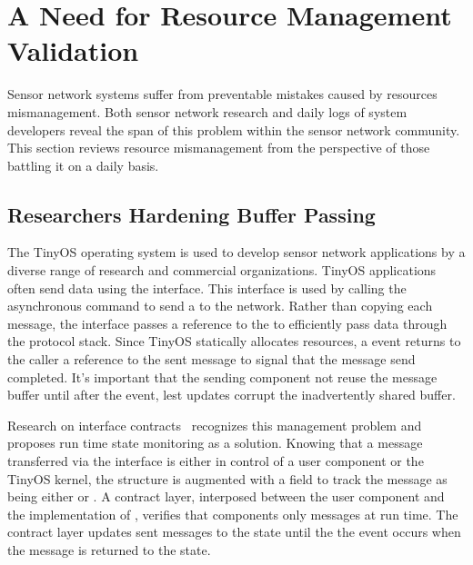 \section{A Need for Resource Management Validation}
\label{sec:mot}

Sensor network systems suffer from preventable mistakes caused by resources
mismanagement.
%
Both sensor network research and daily logs of system developers reveal the
span of this problem within the sensor network community.
%
This section reviews resource mismanagement from the perspective of those
battling it on a daily basis.



\subsection{Researchers Hardening Buffer Passing}


The TinyOS operating system is used to develop sensor network applications by
a diverse range of research and commercial organizations.
%
TinyOS applications often send data using the  interface.
%
This interface is used by calling the asynchronous  command to
send a  to the network.
%
Rather than copying each message, the  interface passes a
reference to the  to efficiently pass data through the protocol
stack.
%
Since TinyOS statically allocates resources, a  event returns to
the caller a reference to the sent message to signal that the message send
completed.
%
It's important that the sending component not reuse the message buffer until
after the  event, lest updates corrupt the inadvertently shared
buffer.



Research on interface contracts~\cite{archer07interface} recognizes this
management problem and proposes run time state monitoring as a solution.
%
Knowing that a message transferred via the  interface is either in
control of a user component or the TinyOS kernel, the 
structure is augmented with a  field to track the message
as being either  or .
%
A contract layer, interposed between the user component and the implementation
of , verifies that components only   
messages at run time.
%
The contract layer updates sent messages to the  state until
the the  event occurs when the message is returned to the
 state.



